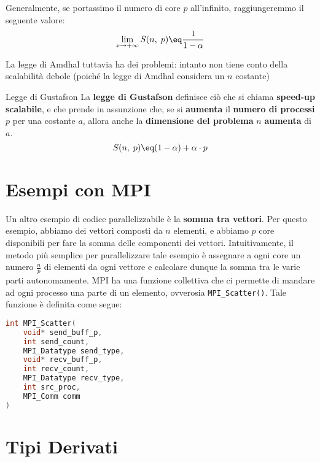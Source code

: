 Generalmente, se portassimo il numero di core $p$ all'infinito, raggiungeremmo il seguente valore:
\[ \lim_{x \to +\infty} S(n, \; p) \eq \frac{1}{1 - \alpha} \]

\noindent La legge di Amdhal tuttavia ha dei problemi: intanto non tiene conto della scalabilità debole (poiché la legge di Amdhal considera un $n$ costante) %

\begin{definition}{Legge di Gustafson}
    La \textbf{legge di Gustafson} definisce ciò che si chiama \textbf{speed-up scalabile}, e che prende in assunzione che, se si \textbf{aumenta} il \textbf{numero di processi} $p$ per una costante $a$, allora anche la \textbf{dimensione del problema} $n$ \textbf{aumenta} di $a$.
    \[ S(n, \; p) \eq (1 - \alpha) + \alpha \cdot p \]
\end{definition}

\section{Esempi con MPI}


Un altro esempio di codice parallelizzabile è la \textbf{somma tra vettori}. Per questo esempio, abbiamo dei vettori composti da $n$ elementi, e abbiamo $p$ core disponibili per fare la somma delle componenti dei vettori. Intuitivamente, il metodo più semplice per parallelizzare tale esempio è assegnare a ogni core un numero $\frac{n}{p}$ di elementi da ogni vettore e calcolare dunque la somma tra le varie parti autonomamente.
\nwl
MPI ha una funzione collettiva che ci permette di mandare ad ogni processo una parte di un elemento, ovverosia \verb|MPI_Scatter()|. Tale funzione è definita come segue:

\begin{codedefine}
    \begin{lstlisting}[language = C, numbers = none]
int MPI_Scatter(
    void* send_buff_p,
    int send_count,
    MPI_Datatype send_type,
    void* recv_buff_p,
    int recv_count,
    MPI_Datatype recv_type,
    int src_proc,
    MPI_Comm comm
)\end{lstlisting}
    \tcblower
\end{codedefine}


\section{Tipi Derivati}

